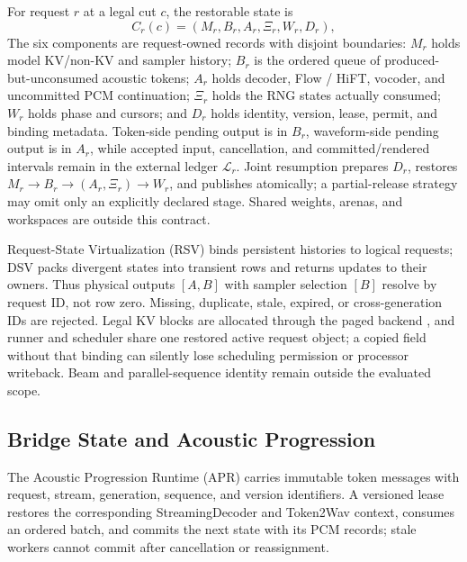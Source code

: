 \documentclass{article}
\begin{document}
For request $r$ at a legal cut $c$, the restorable state is
\begin{equation}
    C_r(c)=(M_r,B_r,A_r,\Xi_r,W_r,D_r),
    \label{eq:joint_state}
\end{equation}
The six components are request-owned records with disjoint boundaries:
$M_r$ holds model KV/non-KV and sampler history; $B_r$ is the ordered queue
of produced-but-unconsumed acoustic tokens; $A_r$ holds decoder, Flow / HiFT,
vocoder, and uncommitted PCM continuation; $\Xi_r$ holds the RNG states
actually consumed; $W_r$ holds phase and cursors; and $D_r$ holds identity,
version, lease, permit, and binding metadata. Token-side pending output is in
$B_r$, waveform-side pending output is in $A_r$, while accepted input,
cancellation, and committed/rendered intervals remain in the external ledger
$\mathcal{L}_r$. Joint resumption prepares $D_r$, restores
$M_r\rightarrow B_r\rightarrow(A_r,\Xi_r)\rightarrow W_r$, and publishes
atomically; a partial-release strategy may omit only an explicitly declared
stage. Shared weights, arenas, and workspaces are outside this contract.

Request-State Virtualization (RSV) binds persistent histories to logical
requests; DSV packs divergent states into transient rows and returns updates
to their owners. Thus physical outputs $[A,B]$ with sampler selection $[B]$
resolve by request ID, not row zero. Missing, duplicate, stale, expired, or
cross-generation IDs are rejected. Legal KV blocks are allocated through
the paged backend \citep{vllm2023}, and runner and scheduler share one
restored active request object; a copied field without that binding can
silently lose scheduling permission or processor writeback. Beam and
parallel-sequence identity remain outside the evaluated scope.

\subsection{Bridge State and Acoustic Progression}
\label{sec:design_acoustic}

The Acoustic Progression Runtime (APR) carries immutable token messages with
request, stream, generation, sequence, and version identifiers. A versioned
lease restores the corresponding StreamingDecoder and Token2Wav context,
consumes an ordered batch, and commits the next state with its PCM records;
stale workers cannot commit after cancellation or reassignment.
\end{document}
